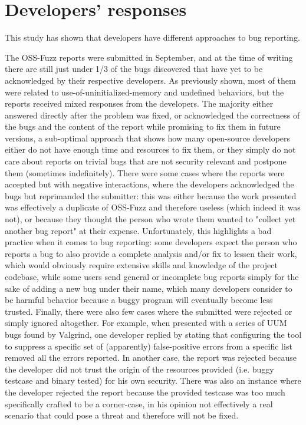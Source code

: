 \newpage
\section{Developers' responses}
This study has shown that developers have different approaches to bug reporting. 

The OSS-Fuzz reports were submitted in September, and at the time of writing there are still just under 1/3 of the bugs discovered that have yet to be acknowledged by their respective developers. 
As previously shown, most of them were related to use-of-uninitialized-memory and undefined behaviors, but the reports received mixed responses from the developers. The majority either answered directly after the problem was fixed, or acknowledged the correctness of the bugs and the content of the report while promising to fix them in future versions, a sub-optimal approach that shows how many open-source developers either do not have enough time and resources to fix them, or they simply do not care about reports on trivial bugs that are not security relevant and postpone them (sometimes indefinitely). 
There were some cases where the reports were accepted but with negative interactions, where the developers acknowledged the bugs but reprimanded the submitter: this was either because the work presented was effectively a duplicate of OSS-Fuzz and therefore useless (which indeed it was not), or because they thought the person who wrote them wanted to "collect yet another bug report" at their expense. Unfortunately, this highlights a bad practice when it comes to bug reporting: some developers expect the person who reports a bug to also provide a complete analysis and/or fix to lessen their work, which would obviously require extensive skills and knowledge of the project codebase, while some users send general or incomplete bug reports simply for the sake of adding a new bug under their name, which many developers consider to be harmful behavior because a buggy program will eventually become less trusted.
Finally, there were also few cases where the submitted were rejected or simply ignored altogether. For example, when presented with a series of UUM bugs found by Valgrind, one developer replied by stating that configuring the tool to suppress a specific set of (apparently) false-positive errors from a specific list removed all the errors reported. In another case, the report was rejected because the developer did not trust the origin of the resources provided (i.e. buggy testcase and binary tested) for his own security. There was also an instance where the developer rejected the report because the provided testcase was too much specifically crafted to be a corner-case, in his opinion not effectively a real scenario that could pose a threat and therefore will not be fixed.  

